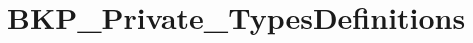 \hypertarget{group___b_k_p___private___types_definitions}{}\section{B\+K\+P\+\_\+\+Private\+\_\+\+Types\+Definitions}
\label{group___b_k_p___private___types_definitions}
